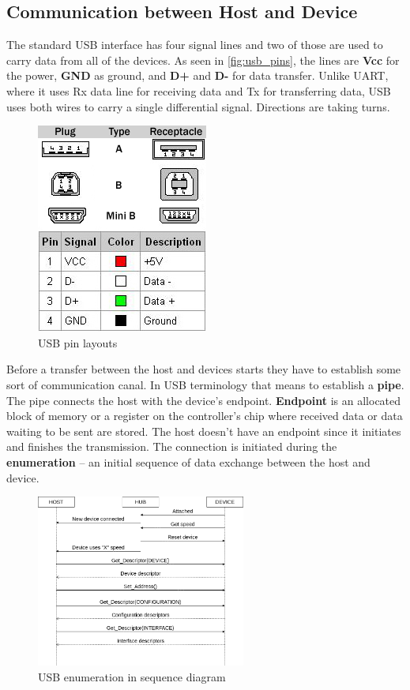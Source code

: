 \subsection*{Communication between Host and Device}
\label{communication}
The standard USB interface has four signal lines and two of those are used to carry data from all of the devices. As seen in \autoref{fig:usb_pins}, the lines are \textbf{Vcc} for the power, \textbf{GND} as ground, and \textbf{D+} and \textbf{D-} for data transfer. Unlike UART, where it uses Rx data line for receiving data and Tx for transferring data, USB uses both wires to carry a single differential signal. Directions are taking turns.

\begin{figure}[ht]
    \centering
    \includegraphics{obrazky-figures/usb_pinouts.png}
    \caption{USB pin layouts}
    \label{fig:usb_pins}
\end{figure}

Before a transfer between the host and devices starts they have to establish some sort of communication canal. In USB terminology that means to establish a \textbf{pipe}. The pipe connects the host with the device's endpoint. \textbf{Endpoint} is an allocated block of memory or a register on the controller's chip where received data or data waiting to be sent are stored. The host doesn't have an endpoint since it initiates and finishes the transmission. The connection is initiated during the \textbf{enumeration} -- an initial sequence of data exchange between the host and device. 

\begin{figure}[ht]
    \centering
    \includegraphics[width=260px]{obrazky-figures/enumeration.png}
    \caption{USB enumeration in sequence diagram}
    \label{fig:enumeration}
\end{figure}

